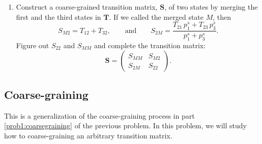 \documentclass[12pt]{article}
\begin{document}
\begin{enumerate}
  \item
  \label{prob1:coarsegraining}
  Construct a coarse-grained transition matrix, $\mathbf S$,
  of two states by merging the first and the third states
  in $\mathbf T$. If we called the merged state $M$, then
  \begin{equation}
  S_{M2} = T_{12} + T_{32},
  \qquad \mathrm{and} \qquad
  S_{2M} =
  \frac{ T_{21} \, p^s_1 + T_{23} \, p^s_3 }
       { p^s_1 + p^s_3 }
  .
  \label{eq:coarse-graining}
  \end{equation}
  Figure out $S_{22}$ and $S_{MM}$
  and complete the transition matrix:
  $$
  \mathbf S
  =
  \left(
    \begin{array}{rr}
      S_{MM}    &   S_{M2} \\
      S_{2M}    &   S_{22}
    \end{array}
  \right).
  $$

%
%


\end{enumerate}



\subsection{Coarse-graining}



This is a generalization of the coarse-graining process
in part \ref{prob1:coarsegraining} of the previous problem.
%
In this problem,
we will study how to coarse-graining
an arbitrary transition matrix.
\end{document}
